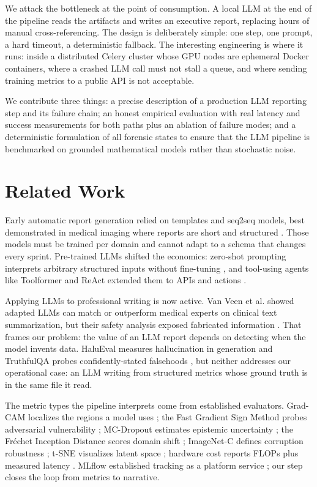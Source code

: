 \documentclass[10pt,twocolumn,letterpaper]{article}
\begin{document}
We attack the bottleneck at the point of consumption. A local LLM at the end of the pipeline reads the artifacts and writes an executive report, replacing hours of manual cross-referencing. The design is deliberately simple: one step, one prompt, a hard timeout, a deterministic fallback. The interesting engineering is where it runs: inside a distributed Celery cluster whose GPU nodes are ephemeral Docker containers, where a crashed LLM call must not stall a queue, and where sending training metrics to a public API is not acceptable.

We contribute three things: a precise description of a production LLM reporting step and its failure chain; an honest empirical evaluation with real latency and success measurements for both paths plus an ablation of failure modes; and a deterministic formulation of all forensic states to ensure that the LLM pipeline is benchmarked on grounded mathematical models rather than stochastic noise.

\section{Related Work}
Early automatic report generation relied on templates and seq2seq models, best demonstrated in medical imaging where reports are short and structured \cite{jing2017automatic}. Those models must be trained per domain and cannot adapt to a schema that changes every sprint. Pre-trained LLMs shifted the economics: zero-shot prompting interprets arbitrary structured inputs without fine-tuning \cite{brown2020language}, and tool-using agents like Toolformer and ReAct extended them to APIs and actions \cite{schick2023toolformer,yao2023react}.

Applying LLMs to professional writing is now active. Van Veen et al. showed adapted LLMs can match or outperform medical experts on clinical text summarization, but their safety analysis exposed fabricated information \cite{vanveen2024adapted}. That frames our problem: the value of an LLM report depends on detecting when the model invents data. HaluEval measures hallucination in generation \cite{lihalu2023halu} and TruthfulQA probes confidently-stated falsehoods \cite{lin2022truthfulqa}, but neither addresses our operational case: an LLM writing from structured metrics whose ground truth is in the same file it read.

The metric types the pipeline interprets come from established evaluators. Grad-CAM localizes the regions a model uses \cite{selvaraju2017gradcam}; the Fast Gradient Sign Method probes adversarial vulnerability \cite{goodfellow2015explaining}; MC-Dropout estimates epistemic uncertainty \cite{gal2016dropout,kendall2017uncertainties}; the Fr\'echet Inception Distance scores domain shift \cite{heusel2017gans}; ImageNet-C defines corruption robustness \cite{hendrycks2019benchmarking}; t-SNE visualizes latent space \cite{vandermaaten2008tsne}; hardware cost reports FLOPs plus measured latency \cite{dollar2021fast}. MLflow established tracking as a platform service \cite{chen2020mlflow}; our step closes the loop from metrics to narrative.
\end{document}
